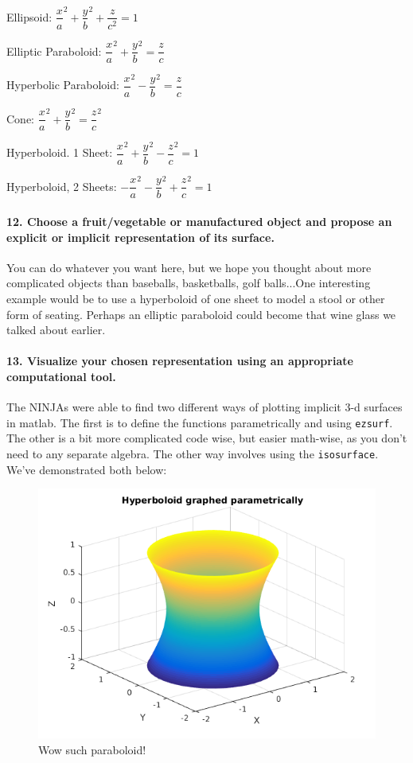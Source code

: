 \documentclass{article}
\begin{document}
Ellipsoid: $\dfrac{x}{a}^2 + \dfrac{y}{b}^2 + \dfrac{z}{c^2} = 1$

Elliptic Paraboloid: $\dfrac{x}{a}^2 + \dfrac{y}{b}^2 = \dfrac{z}{c}$

Hyperbolic Paraboloid: $\dfrac{x}{a}^2 - \dfrac{y}{b}^2 = \dfrac{z}{c}$

Cone: $\dfrac{x}{a}^2 + \dfrac{y}{b}^2 = \dfrac{z}{c}^2$

Hyperboloid. 1 Sheet: $\dfrac{x}{a}^2 + \dfrac{y}{b}^2 - \dfrac{z}{c}^2 = 1$

Hyperboloid, 2 Sheets: $-\dfrac{x}{a}^2 - \dfrac{y}{b}^2 + \dfrac{z}{c}^2 = 1$ 


\paragraph{12. Choose a fruit/vegetable or manufactured object and propose an explicit or implicit representation of its surface.} 

You can do whatever you want here, but we hope you thought about more complicated objects than baseballs, basketballs, golf balls...One interesting example would be to use a hyperboloid of one sheet to model a stool or other form of seating. Perhaps an elliptic paraboloid could become that wine glass we talked about earlier. 

\paragraph{13. Visualize your chosen representation using an appropriate computational tool.}

The NINJAs were able to find two different ways of plotting implicit 3-d surfaces in matlab. The first is to define the functions parametrically and using \texttt{ezsurf}. The other is a bit more complicated code wise, but easier math-wise, as you don't need to any separate algebra. The other way involves using the \texttt{isosurface}. We've demonstrated both below:



\begin{figure}[h!]
    \centering
    \includegraphics[width=0.65\columnwidth]{figs_and_code/hyperboloid_1_parametric.png}
    \caption{Wow such paraboloid!}
\end{figure}
\end{document}
